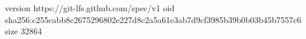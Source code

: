 version https://git-lfs.github.com/spec/v1
oid sha256:c255cabb8c2675296802e227d8c2a5a61e3ab7d9cf3985b39b0b03b45b7557c6
size 32864
